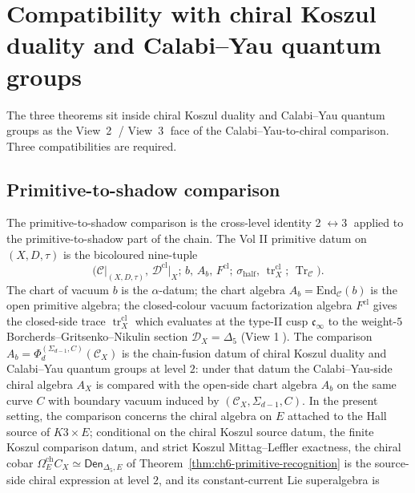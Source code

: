 \section{Compatibility with chiral Koszul duality and Calabi--Yau quantum groups}
\label{sec:ch6-chiral-compatibility}

The three theorems sit inside chiral Koszul duality and
Calabi--Yau quantum groups as the View~\textcircled{2} /
View~\textcircled{3} face of the Calabi--Yau-to-chiral comparison.  Three
compatibilities are required.

\subsection{Primitive-to-shadow comparison}
\label{subsec:ch6-primitive-to-shadow}

The primitive-to-shadow comparison is the cross-level identity
\textcircled{\scriptsize 2}\(\leftrightarrow\)\textcircled{\scriptsize 3}
applied to the primitive-to-shadow part of the chain.  The Vol II primitive
datum on \((X,D,\tau)\) is the bicoloured nine-tuple
\[
\bigl(\mathcal C\big|_{(X,D,\tau)},\,
\mathcal D^{\mathrm{cl}}\big|_X;\,
b,\,A_b,\,F^{\mathrm{cl}};\,
\sigma_{\mathrm{half}},\,\operatorname{tr}^{\mathrm{cl}}_X;\,
\operatorname{Tr}_{\mathcal C}\bigr).
\]
The chart of vacuum \(b\) is the \(\alpha\)-datum; the chart
algebra \(A_b=\mathrm{End}_{\mathcal C}(b)\) is the open primitive
algebra; the closed-colour vacuum factorization algebra
\(F^{\mathrm{cl}}\) gives the closed-side trace
\(\operatorname{tr}^{\mathrm{cl}}_X\) which evaluates at the type-II
cusp \(\mathfrak c_\infty\) to the weight-\(5\) Borcherds--Gritsenko--Nikulin
section \(\mathcal D_X=\Delta_5\) (View \textcircled{\scriptsize 1}).  The
comparison
\(A_b=\Phi^{(\Sigma_{d-1},C)}_d(\mathcal C_X)\) is the chain-fusion datum of
chiral Koszul duality and Calabi--Yau quantum groups at level
\(2\): under that datum the Calabi--Yau-side chiral algebra
\(A_X\) is compared with the open-side chart algebra \(A_b\) on the same
curve \(C\) with boundary vacuum induced by
\((\mathcal C_X,\Sigma_{d-1},C)\).  In the present setting, the
comparison concerns the chiral algebra on \(E\) attached to the Hall
source of \(K3\times E\); conditional on the chiral Koszul source
datum, the finite Koszul comparison datum, and strict Koszul
Mittag--Leffler exactness, the chiral cobar
\(\Omega_E^{\mathrm{ch}}C_X\simeq\mathsf{Den}_{\Delta_5,E}\) of
Theorem~\ref{thm:ch6-primitive-recognition} is the source-side chiral
expression at level \(2\), and its constant-current Lie superalgebra is
